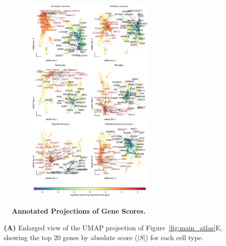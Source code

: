 \begin{figure}[H]
    \begin{subfigure}[t]{1\textwidth}
        \caption{}
        \centering
        \includegraphics[width=0.7\textwidth]{./extended_plots/umap_projection_more_genes.png}        
    \end{subfigure}    
    \caption{
        \textbf{Annotated Projections of Gene Scores.}\\
    }
    \label{fig:snRNAseq_gene_scores}
\end{figure}

\begin{itemize}
    \item[\textbf{(A)}] Enlarged view of the UMAP projection of Figure~\ref{fig:main_atlas}E, showing the top 20 genes by absolute score ($|S|$) for each cell type. 
\end{itemize}
